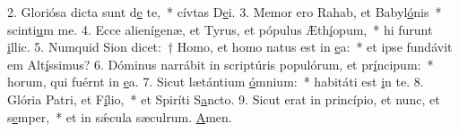 2. Gloriósa dicta sunt d\uline{e} te,~* cívtas D\uline{e}i.
3. Memor ero Rahab, et Babyl\uline{ó}nis~* scinti\uline{u}m me.
4. Ecce alienígenæ, et Tyrus, et pópulus Æth\uline{í}opum,~* hi furunt \uline{i}llic.
5. Numquid Sion dicet:~† Homo, et homo natus est in \uline{e}a:~* et ipse fundávit em Alt\uline{í}ssimus?
6. Dóminus narrábit in scriptúris populórum, et pr\uline{í}ncipum:~* horum, qui fuérnt in \uline{e}a.
7. Sicut lætántium \uline{ó}mnium:~* habitáti est \uline{i}n te.
8. Glória Patri, et F\uline{í}lio,~* et Spiríti S\uline{a}ncto.
9. Sicut erat in princípio, et nunc, et s\uline{e}mper,~* et in sǽcula sæculrum. \uline{A}men.
